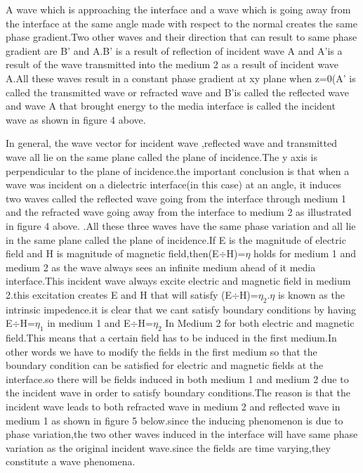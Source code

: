 A wave which is approaching the interface and a wave which is going away from the interface at the same angle made with respect to the normal creates the same phase gradient.Two other waves and their direction that can result to same phase gradient are B'
and A.B' is a result of reflection of incident wave A and A'is a result of the wave transmitted into the medium 2 as a result of incident wave A.All these waves result in a constant phase gradient at xy plane when z=0(A' is called the transmitted wave or refracted wave and B'is called the reflected wave and wave A that brought energy to the media interface is called the incident wave as shown in figure 4 above.



In general, the wave vector for incident wave ,reflected wave and transmitted wave all lie on the same plane called the plane of incidence.The y axis is perpendicular to the plane of incidence.the important conclusion is that when a wave was incident on a dielectric interface(in this case) at an angle, it induces two waves called the reflected wave going from the interface through medium 1  and  the refracted  wave going away from the interface to medium 2 as illustrated in figure 4 above.
.All these three waves have the same phase variation and all lie in the same plane called the plane of incidence.If E is the magnitude of electric field and H is magnitude of magnetic field,then(E$\div$H)=$\eta$ holds for medium 1 and medium 2 as the wave always sees an infinite medium ahead of it media interface.This incident wave always excite electric and magnetic field in medium 2.this excitation creates E and H that will satisfy (E$\div$H)=$\eta_2$.$\eta$ is known as the intrinsic impedence.it is clear that we cant satisfy boundary conditions by having E$\div$H=$\eta_1$ in  medium 1 and E$\div$H=$\eta_2$ In Medium 2 for both electric and magnetic field.This means that a certain field has to be induced in the first medium.In other words we have to modify the fields in the first medium so that the boundary condition can be satisfied for electric and magnetic fields at the interface.so there will be fields induced in both medium 1 and medium 2 due to the incident wave in order to satisfy boundary conditions.The reason is that the incident wave leads to both refracted wave in medium 2 and reflected wave in medium 1 as shown in figure 5 below.since the inducing phenomenon is due to phase variation,the two other waves induced in the interface will have same phase variation as the original incident wave.since the fields are time varying,they constitute a wave phenomena.


